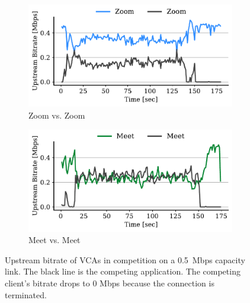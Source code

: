 \begin{figure}[t!]
\centering
\begin{subfigure}[t]{.4\textwidth}
    \centering
    \includegraphics[width=1\textwidth]{figures/comp_ts/zoom_zoom_0.5_ul_r2.pdf}
    \caption{Zoom vs. Zoom}
    \label{subfig:zoom_zoom_0_5}
\end{subfigure}\hfill
\begin{subfigure}[t]{.4\textwidth}
    \centering
    \includegraphics[width=1\textwidth]{figures/comp_ts/meet_meet_0.5_ul_r1.pdf}
    \caption{Meet vs. Meet}
    \label{subfig:meet_meet_0_5}
\end{subfigure}
\caption{Upstream bitrate of VCAs in competition on a 0.5~Mbps capacity link.
    The black line is the competing application. The competing client's bitrate drops to 0 Mbps because the connection is 
terminated.}
\label{fig:meet-zoom-upld-0.5}
\end{figure}

